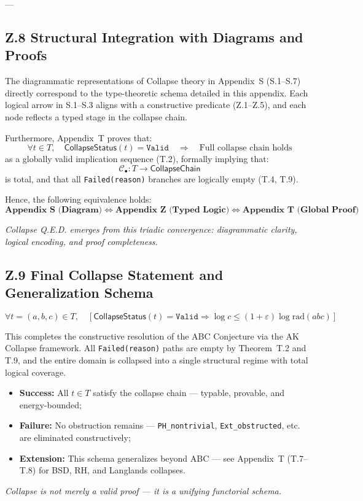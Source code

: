 \documentclass[11pt]{article}
\begin{document}
---

\subsection*{Z.8 Structural Integration with Diagrams and Proofs}

The diagrammatic representations of Collapse theory in Appendix~S (S.1–S.7) directly correspond to  
the type-theoretic schema detailed in this appendix. Each logical arrow in S.1–S.3 aligns with a  
constructive predicate (Z.1–Z.5), and each node reflects a typed stage in the collapse chain.

Furthermore, Appendix~T proves that:
\[
\forall t \in T,\quad \mathsf{CollapseStatus}(t) = \texttt{Valid}
\quad\Rightarrow\quad \text{Full collapse chain holds}
\]
as a globally valid implication sequence (T.2), formally implying that:
\[
\mathcal{C}_\bullet : T \longrightarrow \mathsf{CollapseChain}
\]
is total, and that all \texttt{Failed(reason)} branches are logically empty (T.4, T.9).

Hence, the following equivalence holds:
\[
\boxed{
\textbf{Appendix S (Diagram)} \Longleftrightarrow \textbf{Appendix Z (Typed Logic)} \Longleftrightarrow \textbf{Appendix T (Global Proof)}
}
\]

\begin{center}
\textit{Collapse Q.E.D. emerges from this triadic convergence: diagrammatic clarity, logical encoding, and proof completeness.}
\end{center}



\subsection*{Z.9 Final Collapse Statement and Generalization Schema}

\[
\forall t = (a,b,c) \in T,\quad
\left[
  \mathsf{CollapseStatus}(t) = \texttt{Valid}
  \Rightarrow
  \log c \leq (1+\varepsilon)\log \mathrm{rad}(abc)
\right]
\]

This completes the constructive resolution of the ABC Conjecture via the AK Collapse framework.  
All \texttt{Failed(reason)} paths are empty by Theorem~T.2 and T.9, and the entire domain is  
collapsed into a single structural regime with total logical coverage.

\begin{itemize}
  \item \textbf{Success:} All \( t \in T \) satisfy the collapse chain — typable, provable, and energy-bounded;
  \item \textbf{Failure:} No obstruction remains — \texttt{PH\_nontrivial}, \texttt{Ext\_obstructed}, etc. are eliminated constructively;
  \item \textbf{Extension:} This schema generalizes beyond ABC — see Appendix~T (T.7–T.8) for BSD, RH, and Langlands collapses.
\end{itemize}

\begin{center}
\textit{Collapse is not merely a valid proof — it is a unifying functorial schema.}
\end{center}
\end{document}
